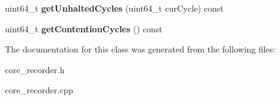 \begin{DoxyCompactItemize}
\item 
\hypertarget{classCoreRecorder_ae30f7a903534b835fb3eae65728e903f}{uint64\-\_\-t {\bfseries get\-Unhalted\-Cycles} (uint64\-\_\-t cur\-Cycle) const }\label{classCoreRecorder_ae30f7a903534b835fb3eae65728e903f}

\item 
\hypertarget{classCoreRecorder_a3f0d400abd3c59e92dad3424b3319400}{uint64\-\_\-t {\bfseries get\-Contention\-Cycles} () const }\label{classCoreRecorder_a3f0d400abd3c59e92dad3424b3319400}

\end{DoxyCompactItemize}


The documentation for this class was generated from the following files\-:\begin{DoxyCompactItemize}
\item 
core\-\_\-recorder.\-h\item 
core\-\_\-recorder.\-cpp\end{DoxyCompactItemize}
